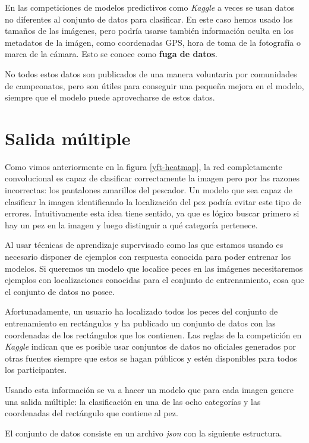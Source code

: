 En las competiciones de modelos predictivos como \textit{Kaggle} a veces se usan datos no diferentes al conjunto de datos para clasificar. En este caso hemos usado los tamaños de las imágenes, pero podría usarse también información oculta en los metadatos de la imágen, como coordenadas GPS, hora de toma de la fotografía o marca de la cámara. Esto se conoce como \textbf{fuga de datos}.

No todos estos datos son publicados de una manera voluntaria por comunidades de campeonatos, pero son útiles para conseguir una pequeña mejora en el modelo, siempre que el modelo puede aprovecharse de estos datos.

\section{Salida múltiple}

Como vimos anteriormente en la figura \ref{yft-heatmap}, la red completamente
convolucional es capaz de clasificar correctamente la imagen pero por las
razones incorrectas: los pantalones amarillos del pescador. Un modelo que sea
capaz de clasificar la imagen identificando la localización del pez podría
evitar este tipo de errores. Intuitivamente esta idea tiene sentido, ya que es lógico
buscar primero si hay un pez en la imagen y luego distinguir a qué categoría
pertenece.

Al usar técnicas de aprendizaje supervisado como las que estamos usando es
necesario disponer de ejemplos con respuesta conocida para poder entrenar los
modelos. Si queremos un modelo que localice peces en las imágenes necesitaremos
ejemplos con localizaciones conocidas para el conjunto de entrenamiento, cosa
que el conjunto de datos no posee.

Afortunadamente, un usuario ha localizado todos los peces del conjunto de
entrenamiento en rectángulos y ha publicado un conjunto de datos con las
coordenadas de los rectángulos que los contienen. Las reglas de la competición
en \textit{Kaggle} indican que es posible usar conjuntos de datos no oficiales
generados por otras fuentes siempre que estos se hagan públicos y estén
disponibles para todos los participantes.

Usando esta información se va a hacer un modelo que para cada imagen genere una
salida múltiple: la clasificación en una de las ocho categorías y las
coordenadas del rectángulo que contiene al pez.

El conjunto de datos consiste en un archivo \textit{json} con la siguiente estructura.


